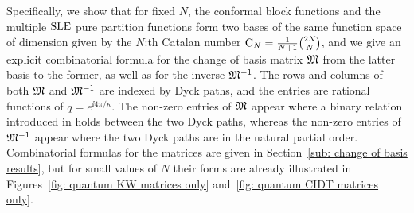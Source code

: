 \documentclass[oneside,english]{amsart}
\numberwithin{equation}{section}
\numberwithin{figure}{section}
\theoremstyle{plain}
\theoremstyle{plain}
\theoremstyle{plain}
\theoremstyle{remark}
\theoremstyle{plain}
\theoremstyle{plain}
\theoremstyle{plain}
\theoremstyle{plain}
\theoremstyle{plain}
\theoremstyle{plain}
\theoremstyle{plain}
\theoremstyle{plain}
\newcommand{\alexmod}[1]{{\color{allucol} #1}}
\newcommand{\blue}[1]{{\color{blue} #1}}
\begin{document}
Specifically, we show that for fixed $N$,
the conformal block functions and the multiple $\mathrm{SLE}$ pure partition functions %
form two bases of the same function space of dimension given by the $N$:th Catalan number 
$\mathrm{C}_N = \frac{1}{N+1} \binom{2N}{N}$,
and we give an explicit combinatorial formula for the change of basis matrix $\mathfrak{M}$
from the latter basis to the former, as well as for the inverse $\mathfrak{M}^{-1}$.
The rows and columns of both $\mathfrak{M}$ and $\mathfrak{M}^{-1}$ are indexed by Dyck paths,
and the entries are rational functions of $q = e^{\ii 4 \pi / \kappa}$.
The non-zero entries of $\mathfrak{M}$ appear where a binary relation introduced in
\cite{KW-double_dimer_pairings_and_skew_Young_diagrams, SZ-path_representations_of_maximal_paraboloc_KL_polynomials}
holds between the two Dyck paths, whereas the
non-zero entries of $\mathfrak{M}^{-1}$ appear where the two Dyck paths are in the
natural partial order. Combinatorial formulas for the matrices %
are
given in Section~\ref{sub: change of basis results}, but for small values of $N$
their forms are already illustrated in
Figures~\ref{fig: quantum KW matrices only} and~\ref{fig: quantum CIDT matrices only}.

\end{document}
